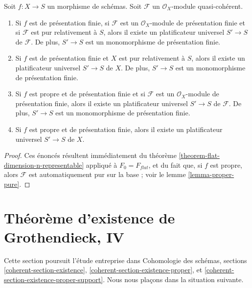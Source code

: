 \begin{lemma}
\label{lemma-when-universal-flattening}
Soit $f : X \to S$ un morphisme de schémas.
Soit $\mathcal{F}$ un $\mathcal{O}_X$-module quasi-cohérent.
\begin{enumerate}
\item Si $f$ est de présentation finie, si $\mathcal{F}$ est un
$\mathcal{O}_X$-module de présentation finie et si $\mathcal{F}$ est
pur relativement à $S$, alors il existe un platificateur universel
$S' \to S$ de $\mathcal{F}$. De plus, $S' \to S$ est un monomorphisme
de présentation finie.
\item Si $f$ est de présentation finie et $X$ est pur relativement à $S$,
alors il existe un platificateur universel $S' \to S$ de $X$.
De plus, $S' \to S$ est un monomorphisme de présentation finie.
\item Si $f$ est propre et de présentation finie et si $\mathcal{F}$ est un
$\mathcal{O}_X$-module de présentation finie, alors il existe un
platificateur universel $S' \to S$ de $\mathcal{F}$. De plus, $S' \to S$ est
un monomorphisme de présentation finie.
\item Si $f$ est propre et de présentation finie,
alors il existe un platificateur universel $S' \to S$ de $X$.
\end{enumerate}
\end{lemma}

\begin{proof}
Ces énoncés résultent immédiatement du
théorème \ref{theorem-flat-dimension-n-representable}
appliqué à $F_0 = F_{flat}$,
et du fait que, si $f$ est propre, alors $\mathcal{F}$ est automatiquement
pur sur la base ; voir le
lemme \ref{lemma-proper-pure}.
\end{proof}







\section{Théorème d'existence de Grothendieck, IV}
\label{section-existence}

\noindent
Cette section poursuit l'étude entreprise dans
Cohomologie des schémas, sections \ref{coherent-section-existence},
\ref{coherent-section-existence-proper}, et
\ref{coherent-section-existence-proper-support}.
Nous nous plaçons dans la situation suivante.

